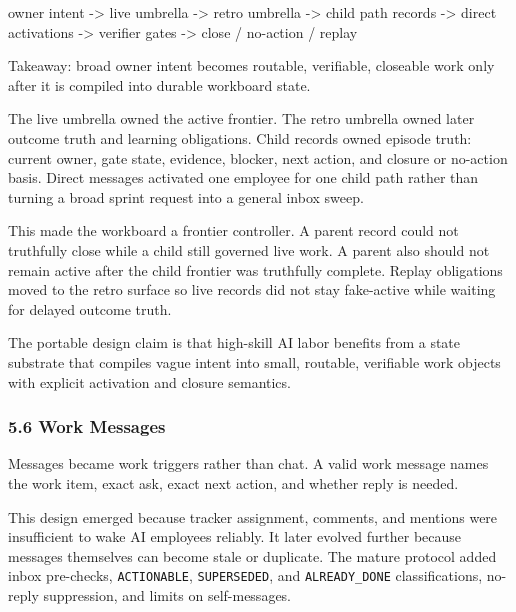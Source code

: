 \documentclass[
]{article}
\newenvironment{Shaded}{}{}
\newcommand{\NormalTok}[1]{#1}
\begin{document}
\begin{Shaded}
\begin{Highlighting}[]
\NormalTok{owner intent}
\NormalTok{  {-}\textgreater{} live umbrella}
\NormalTok{  {-}\textgreater{} retro umbrella}
\NormalTok{  {-}\textgreater{} child path records}
\NormalTok{  {-}\textgreater{} direct activations}
\NormalTok{  {-}\textgreater{} verifier gates}
\NormalTok{  {-}\textgreater{} close / no{-}action / replay}
\end{Highlighting}
\end{Shaded}

Takeaway: broad owner intent becomes routable, verifiable, closeable work only after it is compiled into durable workboard state.

The live umbrella owned the active frontier. The retro umbrella owned later outcome truth and learning obligations. Child records owned episode truth: current owner, gate state, evidence, blocker, next action, and closure or no-action basis. Direct messages activated one employee for one child path rather than turning a broad sprint request into a general inbox sweep.

This made the workboard a frontier controller. A parent record could not truthfully close while a child still governed live work. A parent also should not remain active after the child frontier was truthfully complete. Replay obligations moved to the retro surface so live records did not stay fake-active while waiting for delayed outcome truth.

The portable design claim is that high-skill AI labor benefits from a state substrate that compiles vague intent into small, routable, verifiable work objects with explicit activation and closure semantics.

\subsubsection{5.6 Work Messages}\label{work-messages}

Messages became work triggers rather than chat. A valid work message names the work item, exact ask, exact next action, and whether reply is needed.

This design emerged because tracker assignment, comments, and mentions were insufficient to wake AI employees reliably. It later evolved further because messages themselves can become stale or duplicate. The mature protocol added inbox pre-checks, \texttt{ACTIONABLE}, \texttt{SUPERSEDED}, and \texttt{ALREADY\_DONE} classifications, no-reply suppression, and limits on self-messages.
\end{document}
